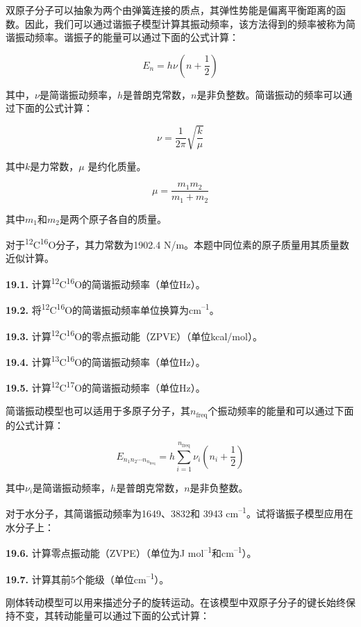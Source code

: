 双原子分子可以抽象为两个由弹簧连接的质点，其弹性势能是偏离平衡距离的函数。因此，我们可以通过谐振子模型计算其振动频率，该方法得到的频率被称为简谐振动频率。谐振子的能量可以通过下面的公式计算：

\[E_n=h\nu\left(n+\frac{1}{2}\right)\]

\noindent 其中，\(\nu\)是简谐振动频率，\(h\)是普朗克常数，\(n\)是非负整数。简谐振动的频率可以通过下面的公式计算：

\[\nu = \frac{1}{2\pi} \sqrt{\frac{k}{\mu}}\]

\noindent 其中\(k\)是力常数，\(\mu\) 是约化质量。

\[\mu=\frac{m_1m_2}{m_1+m_2}\]

\noindent 其中\(m_1\)和\(m_2\)是两个原子各自的质量。

对于\textsuperscript{12}C\textsuperscript{16}O分子，其力常数为1902.4 N/m。本题中同位素的原子质量用其质量数近似计算。

\noindent\textbf{19.1.}
计算\textsuperscript{12}C\textsuperscript{16}O的简谐振动频率（单位Hz）。

\noindent\textbf{19.2.}
将\textsuperscript{12}C\textsuperscript{16}O的简谐振动频率单位换算为cm\textsuperscript{--1}。

\noindent\textbf{19.3.}
计算\textsuperscript{12}C\textsuperscript{16}O的零点振动能（ZPVE）（单位kcal/mol）。

\noindent\textbf{19.4.}
计算\textsuperscript{13}C\textsuperscript{16}O的简谐振动频率（单位Hz）。

\noindent\textbf{19.5.}
计算\textsuperscript{12}C\textsuperscript{17}O的简谐振动频率（单位Hz）。

简谐振动模型也可以适用于多原子分子，其\(n_{\mathrm{freq}}\)个振动频率的能量和可以通过下面的公式计算：

\[E_{n_1n_2\cdots n_{n_{\mathrm{freq}}}} = h\sum^{n_{\mathrm{freq}}}_{i=1} \nu_i \left(n_i + \frac{1}{2}\right)\]

\noindent 其中\(\nu_i\)是简谐振动频率，\(h\)是普朗克常数，\(n\)是非负整数。

对于水分子，其简谐振动频率为1649、3832和 3943 cm\textsuperscript{--1}。试将谐振子模型应用在水分子上：

\noindent\textbf{19.6.}
计算零点振动能（ZVPE）（单位为J mol\textsuperscript{--1}和cm\textsuperscript{--1}）。

\noindent\textbf{19.7.} 计算其前5个能级（单位cm\textsuperscript{--1}）。

刚体转动模型可以用来描述分子的旋转运动。在该模型中双原子分子的键长始终保持不变，其转动能量可以通过下面的公式计算：

